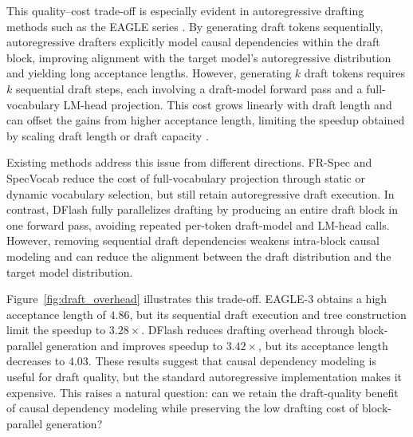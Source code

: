 This quality--cost trade-off is especially evident in autoregressive drafting methods such as the EAGLE series \citep{li2024eagle, li2024eagle2, li2025eagle3}. By generating draft tokens sequentially, autoregressive drafters explicitly model causal dependencies within the draft block, improving alignment with the target model's autoregressive distribution and yielding long acceptance lengths. However, generating \(k\) draft tokens requires \(k\) sequential draft steps, each involving a draft-model forward pass and a full-vocabulary LM-head projection. This cost grows linearly with draft length and can offset the gains from higher acceptance length, limiting the speedup obtained by scaling draft length or draft capacity \citep{zhao2025fr,yan2025scaling}.






Existing methods address this issue from different directions. FR-Spec \citep{zhao2025fr} and SpecVocab \citep{williams2026speculative} reduce the cost of full-vocabulary projection through static or dynamic vocabulary selection, but still retain autoregressive draft execution. In contrast, DFlash \citep{chen2026dflash} fully parallelizes drafting by producing an entire draft block in one forward pass, avoiding repeated per-token draft-model and LM-head calls. However, removing sequential draft dependencies weakens intra-block causal modeling and can reduce the alignment between the draft distribution and the target model distribution.

Figure~\ref{fig:draft_overhead} illustrates this trade-off. 
EAGLE-3 obtains a high acceptance length of \(4.86\), but its sequential draft execution and tree construction limit the speedup to \(3.28\times\). 
DFlash reduces drafting overhead through block-parallel generation and improves speedup to \(3.42\times\), but its acceptance length decreases to \(4.03\). 
These results suggest that causal dependency modeling is useful for draft quality, but the standard autoregressive implementation makes it expensive. 
This raises a natural question: can we retain the draft-quality benefit of causal dependency modeling while preserving the low drafting cost of block-parallel generation?

